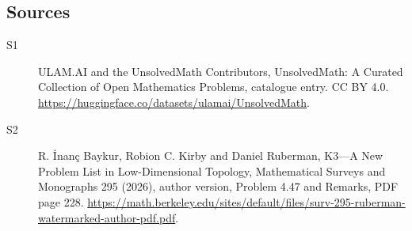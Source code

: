 \documentclass[11pt]{article}
\begin{document}
\subsection{Sources}
\begin{description}
\item[\hypertarget{source:statement:1}{S1}] ULAM.AI and the UnsolvedMath Contributors, UnsolvedMath: A Curated Collection of Open Mathematics Problems, catalogue entry. CC BY 4.0. \url{https://huggingface.co/datasets/ulamai/UnsolvedMath}.
\item[\hypertarget{source:statement:2}{S2}] R. İnanç Baykur, Robion C. Kirby and Daniel Ruberman, K3—A New Problem List in Low-Dimensional Topology, Mathematical Surveys and Monographs 295 (2026), author version, Problem 4.47 and Remarks, PDF page 228. \url{https://math.berkeley.edu/sites/default/files/surv-295-ruberman-watermarked-author-pdf.pdf}.
\end{description}
\label{end:statement}
\end{document}
